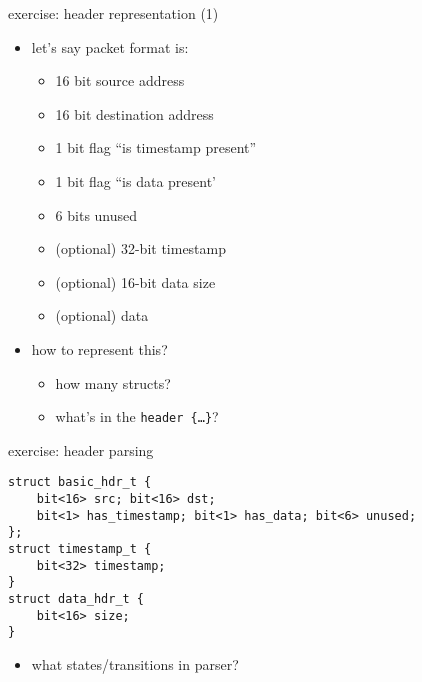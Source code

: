 \begin{frame}{exercise: header representation (1)}
    \begin{itemize}
    \item let's say packet format is:
        \begin{itemize}
        \item 16 bit source address
        \item 16 bit destination address
        \item 1 bit flag ``is timestamp present''
        \item 1 bit flag ``is data present'
        \item 6 bits unused
        \item (optional) 32-bit timestamp
        \item (optional) 16-bit data size
        \item (optional) data
        \end{itemize}
    \item how to represent this?
        \begin{itemize}
        \item how many structs?
        \item what's in the \texttt{header \{\ldots\}}?
        \end{itemize}
    \end{itemize}
\end{frame}

\begin{frame}{}
\end{frame}

\begin{frame}[fragile]{exercise: header parsing}
\begin{Verbatim}[fontsize=\small]
struct basic_hdr_t {
    bit<16> src; bit<16> dst;
    bit<1> has_timestamp; bit<1> has_data; bit<6> unused;
};
struct timestamp_t {
    bit<32> timestamp;
}
struct data_hdr_t {
    bit<16> size;
}
\end{Verbatim}
\begin{itemize}
\item what states/transitions in parser?
\end{itemize}
\end{frame}

